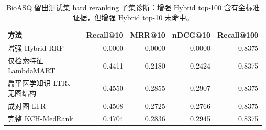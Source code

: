 \begin{table}[t]
\centering
\small
\caption{BioASQ 留出测试集 hard reranking 子集诊断：增强 Hybrid top-100 含有金标准证据，但增强 Hybrid top-10 未命中。}
\label{tab:hard-subset-diagnostic}
\begin{tabular}{lrrrr}
\toprule
方法 & Recall@10 & MRR@10 & nDCG@10 & Recall@100 \\
\midrule
增强 Hybrid RRF & 0.0000 & 0.0000 & 0.0000 & 0.8375 \\
仅检索特征 LambdaMART & 0.4411 & 0.2180 & 0.2424 & 0.8375 \\
扁平医学知识 LTR、无图结构 & 0.4550 & 0.2855 & 0.2907 & 0.8375 \\
成对图 LTR & 0.4508 & 0.2725 & 0.2766 & 0.8375 \\
完整 KCH-MedRank & 0.4704 & 0.2836 & 0.2945 & 0.8375 \\
\bottomrule
\end{tabular}
\end{table}
